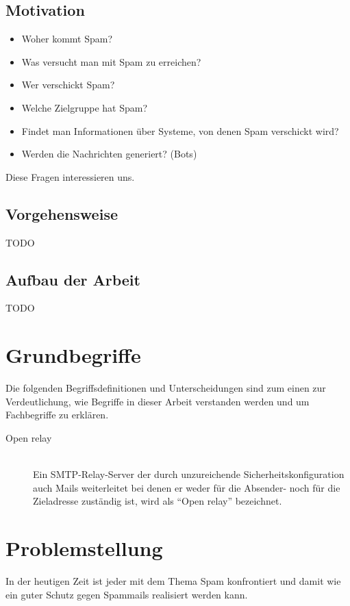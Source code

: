 \documentclass[a4paper,11pt,singlespacing]{article}
\begin{document}
	\subsection{Motivation}\label{sec:Motivation}
		\begin{itemize}
		\item Woher kommt Spam?
		\item Was versucht man mit Spam zu erreichen?
		\item Wer verschickt Spam?
		\item Welche Zielgruppe hat Spam?
		\item Findet man Informationen über Systeme, von denen Spam verschickt wird?
		\item Werden die Nachrichten generiert? (Bots)
		\end{itemize}
		Diese Fragen interessieren uns.
	
	\subsection{Vorgehensweise}\label{sec:Vorgehensweise}
		TODO

	\subsection{Aufbau der Arbeit}\label{sec:Aufbau}
		TODO


\section{Grundbegriffe}\label{sec:Grundbegriffe}
	Die folgenden Begriffsdefinitionen und Unterscheidungen sind zum einen zur Verdeutlichung, wie Begriffe in dieser Arbeit verstanden werden und um Fachbegriffe zu erklären.
	
	\begin{description}
	\item[Open relay\label{itm:OpenRelay}]\hfill \\
		Ein SMTP-Relay-Server der durch unzureichende Sicherheitskonfiguration auch Mails weiterleitet bei denen er weder für die Absender- noch für die Zieladresse zuständig ist, wird als "`Open relay"' bezeichnet.\cite{SMTP-Relay-Server}
	\end{description}


\section{Problemstellung}\label{sec:Problemstellung}
	In der heutigen Zeit ist jeder mit dem Thema Spam konfrontiert und damit wie ein guter Schutz gegen Spammails realisiert werden kann.	
	
\end{document}
